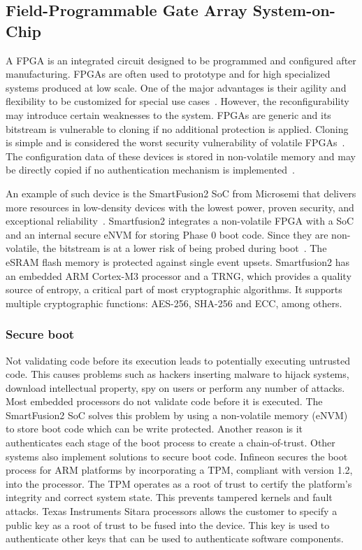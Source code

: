 \subsection{Field-Programmable Gate Array System-on-Chip}\label{chap:background:computing:smartfusion}
A \ac{FPGA} is an integrated circuit designed to be programmed and configured after manufacturing. \ac{FPGA}s are often used to prototype and for high specialized systems produced at low scale. One of the major advantages is their agility and flexibility to be customized for special use cases~\cite{cyberphysicalsystems}. However, the reconfigurability may introduce certain weaknesses to the system. \ac{FPGA}s are generic and its bitstream is vulnerable to cloning if no additional protection is applied. Cloning is simple and is considered the worst security vulnerability of volatile \ac{FPGA}s~\cite{fpgasurvey}. The configuration data of these devices is stored in non-volatile memory and may be directly copied if no authentication mechanism is implemented~\cite{drimer2007authentication}.

An example of such device is the SmartFusion2 \ac{SoC} from Microsemi that delivers more resources in low-density devices with the lowest power, proven security, and exceptional reliability~\cite{smartfusion2soc}. Smartfusion2 integrates a non-volatile \ac{FPGA} with a \ac{SoC} and an internal secure eNVM for storing Phase 0 boot code. Since they are non-volatile, the bitstream is at a lower risk of being probed during boot~\cite{parrinha2017flexible}. The eSRAM flash memory is protected against single event upsets. Smartfusion2 has an embedded ARM Cortex-M3 processor and a \ac{TRNG}, which provides a quality source of entropy, a critical part of most cryptographic algorithms. It supports multiple cryptographic functions: \ac{AES}-256, \ac{SHA}-256 and \ac{ECC}, among others.

\subsubsection*{Secure boot}
Not validating code before its execution leads to potentially executing untrusted code. This causes problems such as hackers inserting malware to hijack systems, download intellectual property, spy on users or perform any number of attacks.
Most embedded processors do not validate code before it is executed. The SmartFusion2 \ac{SoC} solves this problem by using a non-volatile memory (eNVM) to store boot code which can be write protected. Another reason is it authenticates each stage of the boot process to create a chain-of-trust.
Other systems also implement solutions to secure boot code. Infineon secures the boot process for ARM platforms by incorporating a \ac{TPM}, compliant with version 1.2, into the processor. The \ac{TPM} operates as a root of trust to certify the platform's integrity and correct system state. This prevents tampered kernels and fault attacks.
Texas Instruments Sitara processors allows the customer to specify a public key as a root of trust to be fused into the device. This key is used to authenticate other keys that can be used to authenticate software components.

